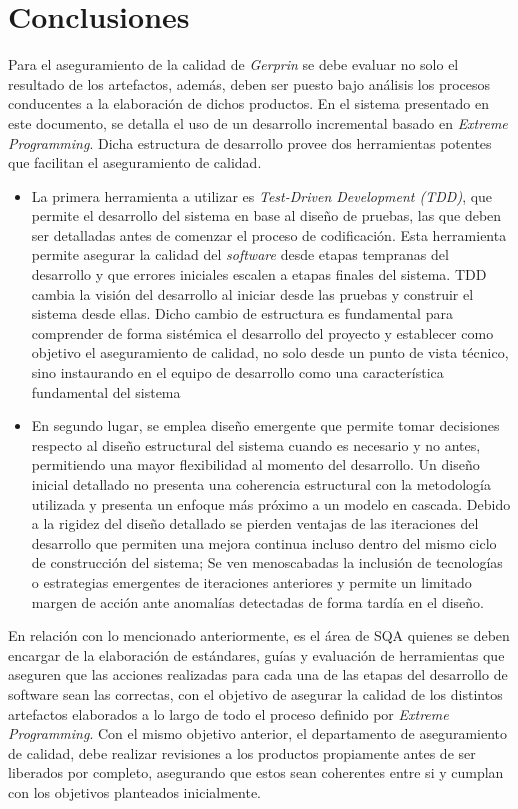 \chapter{Conclusiones }
Para el aseguramiento de la calidad de \textit{Gerprin} se debe evaluar no solo el resultado de los artefactos, además, deben ser puesto bajo análisis los procesos conducentes a la elaboración de dichos productos. 
En el sistema presentado en este documento, se detalla el uso de un desarrollo incremental basado en \textit{Extreme Programming}. Dicha estructura de desarrollo provee dos herramientas potentes que facilitan el aseguramiento de calidad.\begin{itemize}
\item
La primera herramienta a utilizar es \textit{Test-Driven Development (TDD)}, que permite el desarrollo del sistema en base al diseño de pruebas, las que deben  ser detalladas antes de comenzar el proceso de codificación. Esta herramienta permite asegurar la calidad del \textit{software} desde etapas tempranas del desarrollo y que errores iniciales escalen a etapas finales del sistema. 
TDD cambia la visión del desarrollo al iniciar desde las pruebas y construir el sistema desde ellas. Dicho cambio de estructura es fundamental para comprender de forma sistémica el desarrollo del proyecto y establecer como objetivo el aseguramiento de calidad, no solo desde un punto de vista técnico, sino instaurando en el equipo de desarrollo como una característica fundamental del sistema 
\item
En segundo lugar, se emplea diseño emergente que permite tomar decisiones respecto al diseño estructural del sistema cuando es necesario y no antes, permitiendo una mayor flexibilidad al momento del desarrollo.
Un diseño inicial detallado no presenta una coherencia estructural con la metodología utilizada y presenta un enfoque más próximo a un modelo en cascada. Debido a la rigidez del diseño detallado se pierden ventajas de las iteraciones del desarrollo que permiten una mejora continua incluso dentro del mismo ciclo de construcción del sistema; Se ven menoscabadas la inclusión de tecnologías o estrategias emergentes de iteraciones anteriores y permite un limitado margen de acción ante anomalías detectadas de forma tardía en el diseño. 
\end{itemize}
En relación con lo mencionado anteriormente, es el área de SQA quienes se deben encargar de la elaboración de estándares, guías y evaluación de herramientas que aseguren que las acciones realizadas para cada una de las etapas del desarrollo de software sean las correctas, con el objetivo de asegurar la calidad de los distintos artefactos elaborados a lo largo de todo el proceso definido por \textit{Extreme Programming}. Con el mismo objetivo anterior, el departamento de aseguramiento de calidad, debe realizar revisiones a los productos propiamente antes de ser liberados por completo, asegurando que estos sean coherentes entre si y cumplan con los objetivos planteados inicialmente. 
